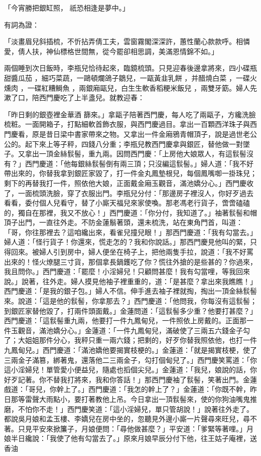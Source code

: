 \begin{showcontents}{}
「今宵勝把銀缸照，  祇恐相逢是夢中。」

有詞為證：

「淡畫眉兒斜插梳，不忻拈弄倩工夫，雲窗霧閣深深許，蕙性蘭心款款呼。相憐愛，倩人扶，神仙標格世間無，從今罷卻相思調，美滿恩情錦不如。」

兩個睡到次日飯時，李瓶兒恰待起來，臨鏡梳頭。只見迎春後邊拿將來，四小碟瓶甜醬瓜茄 ，細巧菜蔬，一鷗頓爛鴿子鶵兒，一甌黃韭乳餅 ，并醋燒白菜 ，一碟火燻肉 ，一碟紅糟鰣魚 ，兩銀廂甌兒，白生生軟香稻粳米飯兒 ，兩雙牙筯。婦人先漱了口，陪西門慶吃了上半盞兒。就教迎春：

「昨日剩的銀壺裡金華酒 篩來。」拿甌子陪著西門慶，每人吃了兩甌子，方纔洗臉梳粧。一面開箱子，打點細軟首飾衣服，與西門慶過目。拿出一百顆西洋珠子與西門慶看，原是昔日梁中書家帶來之物。又拿出一件金廂鴉青帽頂子，說是過世老公公的。起下來上等子秤，四錢八分重；李瓶兒教西門慶拿與銀匠，替他做一對墜子。又拿出一頂金絲䯼髻，重九兩。因問西門慶：「上房他大娘眾人，有這䯼髻沒有？」西門慶道：「他每銀絲䯼髻倒有兩三頂；只沒編這䯼髻。」婦人道：「我不好帶出來的，你替我拿到銀匠家毀了，打一件金丸鳳墊根兒，每個鳳嘴啣一掛珠兒；剩下的再替我打一件，照依他大娘，正面戴金廂玉觀音，滿池嬌分心。」西門慶收了，一面梳頭洗臉，穿了衣服出門。李瓶兒分付：「那邊房子裡沒人，你好歹過去看看，委付個人兒看守，替了小廝天福兒來家使喚。那老馮老行貨子，啻啻磕磕的，獨自在那裡，我又不放心！」西門慶道：「你分付，我知道了。」袖著䯼髻和帽頂子出門，一直往外走。不防金蓮鬅著頭，還未梳洗，站在東角門首，叫道：「哥，你往那裡去？這咱纔出來，看雀兒撞兒眼！」那西門慶道：「我有勾當去。」婦人道：「怪行貨子！你還來，慌走怎的？我和你說話。」那西門慶見他叫的緊，只得回來。被婦人引到房中，婦人便坐在椅子上，把他兩隻手拉，說道：「我不好罵出來的！怪火燎腿三寸貨，那個拿長鍋鑊吃了你？慌往外搶的是些甚的？你過來，我且問你。」西門慶道：「罷麼！小淫婦兒！只顧問甚麼！我有勾當哩，等我回來說。」說著，往外走。婦人摸見他袖子裡重重的，道：「是甚麼？拿出來我瞧瞧！」西門慶道：「是我的銀子包。」婦人不信。伸手進去袖子裡就掏，掏出一頂金絲䯼髻來。說道：「這是他的䯼髻，你拿那去？」西門慶道：「他問我，你每沒有這䯼髻；到銀匠家替他毀了，打兩件頭面戴。」金蓮問道：「這䯼髻多少重？他要打甚麼？」西門慶道：「這䯼髻重九兩，他要打一件九鳳甸兒，一件照依上房戴的。正面那一件玉觀音，滿池嬌分心。」金蓮道：「一件九鳳甸兒，滿破使了三兩五六錢金子勾了；大姐姐那件分心，我秤只重一兩六錢；把剩的，好歹你替我照依他，也打一件九鳳甸兒。」西門慶道：「滿池嬌他要揭實枝梗的。」金蓮道：「就是揭實枝梗，使了三兩金子滿篡，綁著鬼，還落他二三兩金子，勾打個甸兒了。」西門慶笑罵道：「你這小淫婦兒！單管愛小便益兒，隨處也搯個尖兒。」金蓮道：「我兒，娘說的話，你好歹記著。你不替我打將來，我和你答話！」那西門慶袖了䯼髻，笑著出門。金蓮戲道：「哥兒，你幹上了。」西門慶道：「我怎的幹上了？」金蓮道：「你既不幹，昨日那等雷聲大雨點小，要打著教他上吊。今日拿出一頂䯼髻來，使的你狗油嘴鬼推磨，不怕你不走！」西門慶笑道：「這小淫婦兒，單只管胡說！」說著往外走了。都說吳月娘和孟玉樓、李嬌兒在房中坐的，忽聽見外邊小廝一片聲尋來旺兒，尋不著。只見平安來掀簾子，月娘便問：「尋他做甚麼？」平安道：「爹緊等著哩。」月娘半日纔說：「我使了他有勾當去了。」原來月娘早辰分付下他，往王姑子庵裡，送香油 
\end{showcontents}
